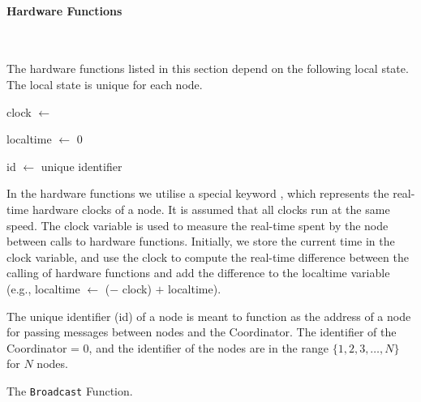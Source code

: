 
\paragraph{Hardware Functions}\label{sec:hwfuncspseudo} \

The hardware functions listed in this section depend on the following local state. The local state is unique for each node.\smallbreak

clock $\leftarrow$ \KwNow

localtime $\leftarrow$ 0

id $\leftarrow$ unique identifier \smallbreak

In the hardware functions we utilise a special keyword \KwNow, which represents the real-time hardware clocks of a node. It is assumed that all clocks run at the same speed. The clock variable is used to measure the real-time spent by the node between calls to hardware functions. Initially, we store the current time in the clock variable, and use the clock to compute the real-time difference between the calling of hardware functions and add the difference to the localtime variable (e.g., localtime $\leftarrow$ (\KwNow $-$ clock) $+$ localtime).

The unique identifier (id) of a node is meant to function as the address of a node for passing messages between nodes and the Coordinator. The identifier of the Coordinator = $0$, and the identifier of the nodes are in the range $\{ 1, 2, 3, \ldots, N \}$ for $N$ nodes.


\begin{algorithm}[ht]
    \DontPrintSemicolon
    

    \caption{The \texttt{Broadcast} Function.}
    \label{algo:hwfuncstransmit}
\end{algorithm}

